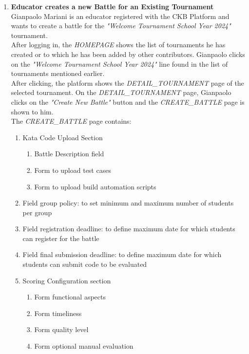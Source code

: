 \begin{enumerate}
	\item \textbf{Educator creates a new Battle for an Existing Tournament}\\
	      Gianpaolo Mariani is an educator registered with the CKB Platform and wants to create a battle for the \emph{"Welcome Tournament School Year 2024"} tournament.\\
	      After logging in, the \emph{HOMEPAGE} shows the list of tournaments he has created or to which he has been added by other contributors. Gianpaolo clicks on the \emph{"Welcome
		      Tournament School Year 2024"} line found in the list of tournaments mentioned earlier.\\
	      After clicking, the platform shows the \emph{DETAIL\_TOURNAMENT} page of the selected tournament.
	      On the \emph{DETAIL\_TOURNAMENT} page, Gianpaolo clicks on the \emph{"Create New Battle"} button and the \emph{CREATE\_BATTLE} page is shown to him.\\
	      The \emph{CREATE\_BATTLE} page contains:

	      \begin{enumerate}
		      \item Kata Code Upload Section
		            \begin{enumerate}
			            \item Battle Description field
			            \item Form to upload test cases
			            \item Form to upload build automation scripts
		            \end{enumerate}
		      \item Field group policy: to set minimum and maximum number of students per group
		      \item Field registration deadline: to define maximum date for which students can register for the battle
		      \item Field final submission deadline: to define maximum date for which students can submit code to be evaluated
		      \item Scoring Configuration section

		            \begin{enumerate}
			            \item Form functional aspects
			            \item Form timeliness
			            \item Form quality level
			            \item Form optional manual evaluation
		            \end{enumerate}



\end{enumerate}
\end{enumerate}
